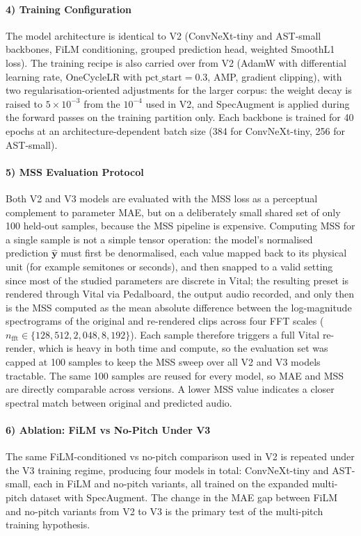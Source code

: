 \paragraph{4) Training Configuration}
The model architecture is identical to V2 (ConvNeXt-tiny and AST-small backbones, FiLM conditioning, grouped prediction head, weighted SmoothL1 loss). The training recipe is also carried over from V2 (AdamW with differential learning rate, OneCycleLR with $\text{pct\_start}=0.3$, AMP, gradient clipping), with two regularisation-oriented adjustments for the larger corpus: the weight decay is raised to $5\times10^{-3}$ from the $10^{-4}$ used in V2, and SpecAugment is applied during the forward passes on the training partition only. Each backbone is trained for 40 epochs at an architecture-dependent batch size (384 for ConvNeXt-tiny, 256 for AST-small).

\paragraph{5) MSS Evaluation Protocol}
Both V2 and V3 models are evaluated with the MSS loss as a perceptual complement to parameter MAE, but on a deliberately small shared set of only 100 held-out samples, because the MSS pipeline is expensive. Computing MSS for a single sample is not a simple tensor operation: the model's normalised prediction $\hat{\mathbf{y}}$ must first be denormalised, each value mapped back to its physical unit (for example semitones or seconds), and then snapped to a valid setting since most of the studied parameters are discrete in Vital; the resulting preset is rendered through Vital via Pedalboard, the output audio recorded, and only then is the MSS computed as the mean absolute difference between the log-magnitude spectrograms of the original and re-rendered clips across four FFT scales ($n_{\text{fft}} \in \{128, 512, 2{,}048, 8{,}192\}$). Each sample therefore triggers a full Vital re-render, which is heavy in both time and compute, so the evaluation set was capped at 100 samples to keep the MSS sweep over all V2 and V3 models tractable. The same 100 samples are reused for every model, so MAE and MSS are directly comparable across versions. A lower MSS value indicates a closer spectral match between original and predicted audio.

\paragraph{6) Ablation: FiLM vs No-Pitch Under V3}
The same FiLM-conditioned vs no-pitch comparison used in V2 is repeated under the V3 training regime, producing four models in total: ConvNeXt-tiny and AST-small, each in FiLM and no-pitch variants, all trained on the expanded multi-pitch dataset with SpecAugment. The change in the MAE gap between FiLM and no-pitch variants from V2 to V3 is the primary test of the multi-pitch training hypothesis.


